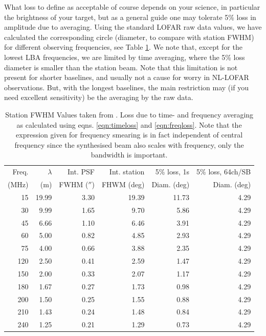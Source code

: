 What loss to define as acceptable of course depends on your science, in
particular the brightness of your target, but as a general guide one may
tolerate 5\% loss in amplitude due to averaging. Using the standard LOFAR raw
data values, we have calculated the corresponding circle (diameter, to compare
with station FWHM) for different observing frequencies, see Table
\ref{tab:res}. We note that, except for the lowest LBA frequencies, we are 
limited by time averaging, where the 5\% loss diameter is smaller than the 
station beam. Note that this limitation is not present for shorter baselines,
and usually not a cause for worry in NL-LOFAR observations. But, with the longest
baselines, the main restriction may (if you need excellent sensitivity) be
the averaging by the raw data.

\begin{table}[h]
\centering
\begin{tabular}{rrrrrr}
Freq. & $\lambda$ & Int. PSF & Int. station& 5\% loss, 1s& 5\% loss, 64ch/SB\\
(MHz) & (m) & FWHM ($''$) & FHWM (deg) & Diam. (deg) & Diam. (deg)\\
\hline
15 & 19.99 & 3.30 & 19.39 & 11.73 & 4.29\\
30 & 9.99 & 1.65 & 9.70 & 5.86 & 4.29\\
45 & 6.66 & 1.10 & 6.46 & 3.91 & 4.29\\
60 & 5.00 & 0.82 & 4.85 & 2.93 & 4.29\\
75 & 4.00 & 0.66 & 3.88 & 2.35 & 4.29\\
120 & 2.50 & 0.41 & 2.59 & 1.47 & 4.29\\
150 & 2.00 & 0.33 & 2.07 & 1.17 & 4.29\\
180 & 1.67 & 0.27 & 1.73 & 0.98 & 4.29\\
200 & 1.50 & 0.25 & 1.55 & 0.88 & 4.29\\
210 & 1.43 & 0.24 & 1.48 & 0.84 & 4.29\\
240 & 1.25 & 0.21 & 1.29 & 0.73 & 4.29\\

\end{tabular}
\caption{Station FWHM Values taken from \cite[App. B]{vanhaarlem2013}. Loss due
to time- and frequency averaging as calculated using eqns.
\ref{eqn:timeloss} and \ref{eqn:freqloss}. Note that the expression
given for frequency smearing is in fact independent of central frequency since
the synthesised beam also scales with frequency, only the
bandwidth is important.
\label{tab:res}}
\end{table}

